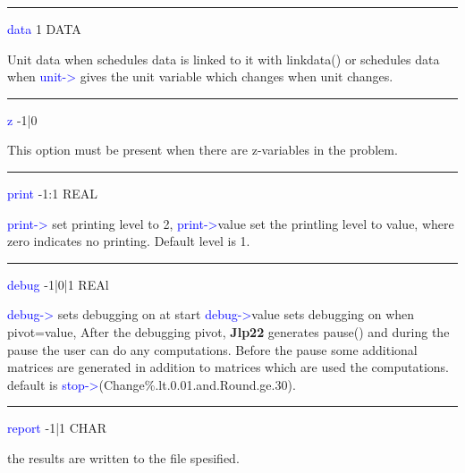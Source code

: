 \hrule
\vspace{0.3cm}
\noindent \textcolor{blue}{data} \tabto{3cm} 1 \tabto{5cm}  DATA \tabto{7cm}
\begin{changemargin}{3cm}{0cm}
\noindent  Unit data when schedules data is linked to it with \textcolor{VioletRed}{linkdata}() or schedules data when
\textcolor{blue}{unit->} gives the  unit variable which changes when unit changes.
\end{changemargin}
\vspace{0.3cm}
\hrule
\vspace{0.3cm}
\noindent \textcolor{blue}{z} \tabto{3cm} -1|0  \tabto{5cm}    \tabto{7cm}
\begin{changemargin}{3cm}{0cm}
\noindent This option must be present when there are z-variables in the problem.
\end{changemargin}
\vspace{0.3cm}
\hrule
\vspace{0.3cm}
\noindent \textcolor{blue}{print} \tabto{3cm} -1:1 \tabto{5cm}  REAL \tabto{7cm}
\begin{changemargin}{3cm}{0cm}
\noindent  \textcolor{blue}{print->} set printing level to 2, \textcolor{blue}{print->}value set the printling level to value, where zero indicates no
printing. Default level is 1.

\end{changemargin}
\vspace{0.3cm}
\hrule
\vspace{0.3cm}
\noindent \textcolor{blue}{debug} \tabto{3cm} -1|0|1 \tabto{5cm}  REAl \tabto{7cm}
\begin{changemargin}{3cm}{0cm}
\noindent  \textcolor{blue}{debug->} sets debugging on at start \textcolor{blue}{debug->}value sets debugging on when pivot=value,
After the debugging pivot, \textbf{Jlp22} generates \textcolor{VioletRed}{pause}() and during the pause the user can do any computations. Before
the pause some additional matrices are generated in addition to matrices which are used
the computations.
default is \textcolor{blue}{stop->}(Change\%.lt.0.01.and.Round.ge.30).
\end{changemargin}
\vspace{0.3cm}
\hrule
\vspace{0.3cm}
\noindent \textcolor{blue}{report} \tabto{3cm} -1|1 \tabto{5cm}   CHAR  \tabto{7cm}
\begin{changemargin}{3cm}{0cm}
\noindent  the results are written to the file spesified.
\end{changemargin}
\vspace{0.3cm}
